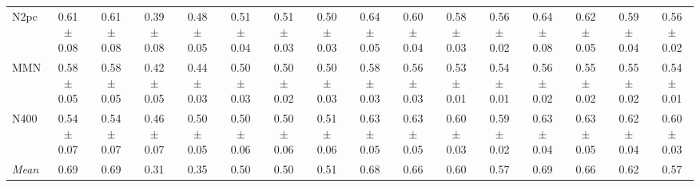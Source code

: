 \begin{table}[t]
\begin{tabular}{lccccccccccccccc}
N2pc & 0.61 $\pm$ 0.08 & 0.61 $\pm$ 0.08 & 0.39 $\pm$ 0.08 & 0.48 $\pm$ 0.05 & 0.51 $\pm$ 0.04 & 0.51 $\pm$ 0.03 & 0.50 $\pm$ 0.03 & 0.64 $\pm$ 0.05 & 0.60 $\pm$ 0.04 & 0.58 $\pm$ 0.03 & 0.56 $\pm$ 0.02 & 0.64 $\pm$ 0.08 & 0.62 $\pm$ 0.05 & 0.59 $\pm$ 0.04 & 0.56 $\pm$ 0.02 \\
MMN & 0.58 $\pm$ 0.05 & 0.58 $\pm$ 0.05 & 0.42 $\pm$ 0.05 & 0.44 $\pm$ 0.03 & 0.50 $\pm$ 0.03 & 0.50 $\pm$ 0.02 & 0.50 $\pm$ 0.03 & 0.58 $\pm$ 0.03 & 0.56 $\pm$ 0.03 & 0.53 $\pm$ 0.01 & 0.54 $\pm$ 0.01 & 0.56 $\pm$ 0.02 & 0.55 $\pm$ 0.02 & 0.55 $\pm$ 0.02 & 0.54 $\pm$ 0.01 \\
N400 & 0.54 $\pm$ 0.07 & 0.54 $\pm$ 0.07 & 0.46 $\pm$ 0.07 & 0.50 $\pm$ 0.05 & 0.50 $\pm$ 0.06 & 0.50 $\pm$ 0.06 & 0.51 $\pm$ 0.06 & 0.63 $\pm$ 0.05 & 0.63 $\pm$ 0.05 & 0.60 $\pm$ 0.03 & 0.59 $\pm$ 0.02 & 0.63 $\pm$ 0.04 & 0.63 $\pm$ 0.05 & 0.62 $\pm$ 0.04 & 0.60 $\pm$ 0.03 \\
\midrule
\textit{Mean} & 0.69 & 0.69 & 0.31 & 0.35 & 0.50 & 0.50 & 0.51 & 0.68 & 0.66 & 0.60 & 0.57 & 0.69 & 0.66 & 0.62 & 0.57 \\
\bottomrule
\end{tabular}
\end{table}
